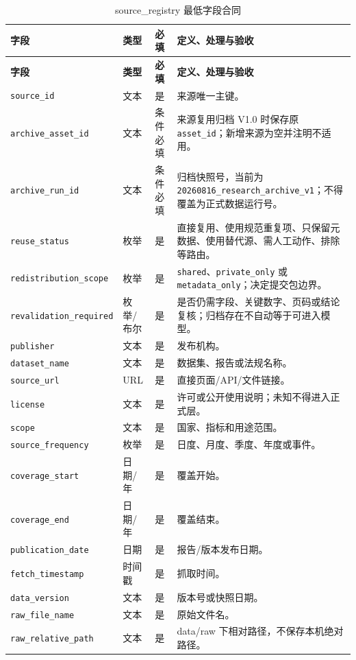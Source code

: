 \documentclass[UTF8,fontset=windows,12pt,openany]{ctexbook}
\newcommand{\Field}[1]{{\small\nolinkurl{#1}}}
\begin{document}
\begin{longtable}{p{3.7cm}p{2.3cm}p{2.1cm}p{5.1cm}}
\caption{source\_registry 最低字段合同}\label{tab:dict-source}\\
\toprule
\textbf{字段} & \textbf{类型} & \textbf{必填} & \textbf{定义、处理与验收}\\
\midrule
\endfirsthead
\toprule \textbf{字段} & \textbf{类型} & \textbf{必填} & \textbf{定义、处理与验收}\\ \midrule
\endhead
\Field{source_id} & 文本 & 是 & 来源唯一主键。\\
\Field{archive_asset_id} & 文本 & 条件必填 & 来源复用归档 V1.0 时保存原 \Field{asset_id}；新增来源为空并注明不适用。\\
\Field{archive_run_id} & 文本 & 条件必填 & 归档快照号，当前为 \Field{20260816_research_archive_v1}；不得覆盖为正式数据运行号。\\
\Field{reuse_status} & 枚举 & 是 & 直接复用、使用规范重复项、只保留元数据、使用替代源、需人工动作、排除等路由。\\
\Field{redistribution_scope} & 枚举 & 是 & \Field{shared}、\Field{private_only} 或 \Field{metadata_only}；决定提交包边界。\\
\Field{revalidation_required} & 枚举/布尔 & 是 & 是否仍需字段、关键数字、页码或结论复核；归档存在不自动等于可进入模型。\\
\Field{publisher} & 文本 & 是 & 发布机构。\\
\Field{dataset_name} & 文本 & 是 & 数据集、报告或法规名称。\\
\Field{source_url} & URL & 是 & 直接页面/API/文件链接。\\
\Field{license} & 文本 & 是 & 许可或公开使用说明；未知不得进入正式层。\\
\Field{scope} & 文本 & 是 & 国家、指标和用途范围。\\
\Field{source_frequency} & 枚举 & 是 & 日度、月度、季度、年度或事件。\\
\Field{coverage_start} & 日期/年 & 是 & 覆盖开始。\\
\Field{coverage_end} & 日期/年 & 是 & 覆盖结束。\\
\Field{publication_date} & 日期 & 是 & 报告/版本发布日期。\\
\Field{fetch_timestamp} & 时间戳 & 是 & 抓取时间。\\
\Field{data_version} & 文本 & 是 & 版本号或快照日期。\\
\Field{raw_file_name} & 文本 & 是 & 原始文件名。\\
\Field{raw_relative_path} & 文本 & 是 & data/raw 下相对路径，不保存本机绝对路径。\\

\end{longtable}
\end{document}

